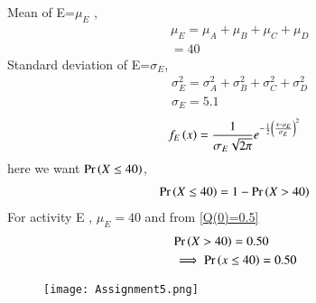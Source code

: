 \documentclass[journal,12pt,twocolumn]{IEEEtran}
\begin{document}
Mean of E=$\mu_E$ ,
\begin{align}
&\mu_E=\mu_A+\mu_B+\mu_C+\mu_D\\
&=40
\end{align}
Standard deviation of E=$\sigma_E$,
\begin{align}
&\sigma_E^2=\sigma_A^2+\sigma_B^2+\sigma_C^2+\sigma_D^2\\
&\sigma_E=5.1
\end{align}
\begin{align}
f_E\left(x\right)=\frac{1}{\sigma_E\sqrt{2\pi}}e^{-\frac{1}{2}\left(\frac{x-\mu_E}{\sigma_E}\right)^2}
\end{align}
here we want $\Pr\left(X\leq40\right)$,
\begin{align}
\Pr\left(X\leq40\right)=1-\Pr\left(X>40\right)    
\end{align}
For activity E , $\mu_E=40$ and from \eqref{Q(0)=0.5}
\begin{align}
&\Pr\left(X>40\right)=0.50\\
&\implies\Pr\left(x\leq40\right)=0.50
\end{align}
\begin{figure}[h]
    \centering
    \texttt{[image: Assignment5.png]}
    \label{fig:my_label}
\end{figure}
\end{document}
